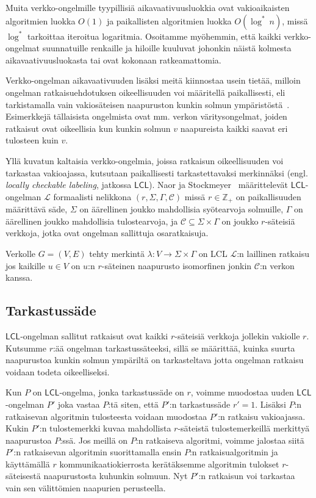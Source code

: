 \documentclass[12pt,finnish]{tktltiki2}
\theoremstyle{definition}
\theoremstyle{remark}
\newcommand*{\lcl}{\ensuremath{\mathsf{LCL}}}
\begin{document}
Muita verkko-ongelmille tyypillisiä aikavaativuusluokkia ovat vakioaikaisten algoritmien luokka $O(1)$ ja paikallisten algoritmien luokka $O(\log^*\ n)$, missä $\log^*$ tarkoittaa iteroitua logaritmia. Osoitamme myöhemmin, että kaikki verkko-ongelmat suunnatuille renkaille ja hiloille kuuluvat johonkin näistä kolmesta aikavaativuusluokasta tai ovat kokonaan ratkeamattomia.

Verkko-ongelman aikavaativuuden lisäksi meitä kiinnostaa usein tietää, milloin ongelman ratkaisuehdotuksen oikeellisuuden voi määritellä paikallisesti, eli tarkistamalla vain vakiosäteisen naapuruston kunkin solmun ympäristöstä~\cite{linial92}. Esimerkkejä tällaisista ongelmista ovat mm. verkon väritysongelmat, joiden ratkaisut ovat oikeellisia kun kunkin solmun $v$ naapureista kaikki saavat eri tulosteen kuin $v$.

Yllä kuvatun kaltaisia verkko-ongelmia, joissa ratkaisun oikeellisuuden voi tarkastaa vakioajassa, kutsutaan paikallisesti tarkastettavaksi merkinnäksi (engl. \textit{locally checkable labeling}, jatkossa \lcl). Naor ja Stockmeyer~\cite{naor95} määrittelevät \lcl-ongelman $\mathcal{L}$ formaalisti nelikkona $(r, \Sigma, \Gamma, \mathcal{C})$ missä $r \in \mathbb{Z}_+$ on paikallisuuden määrittävä säde, $\Sigma$ on äärellinen joukko mahdollisia syötearvoja solmuille, $\Gamma$ on äärellinen joukko mahdollisia tulostearvoja, ja $\mathcal{C} \subseteq \Sigma \times \Gamma$ on joukko $r$-säteisiä verkkoja, jotka ovat ongelman sallittuja osaratkaisuja.


Verkolle $G = (V, E)$ tehty merkintä $\lambda : V \rightarrow \Sigma \times \Gamma$ on LCL $\mathcal{L}$:n laillinen ratkaisu jos kaikille $u \in V$ on $u$:n $r$-säteinen naapurusto isomorfinen jonkin $\mathcal{C}$:n verkon kanssa.

\subsection{Tarkastussäde}
\lcl -ongelman sallitut ratkaisut ovat kaikki $r$-säteisiä verkkoja jollekin vakiolle $r$. Kutsumme $r$:ää ongelman tarkastussäteeksi, sillä se määrittää, kuinka suurta naapurustoa kunkin solmun ympäriltä on tarkasteltava jotta ongelman ratkaisu voidaan todeta oikeelliseksi.

Kun $P$ on \lcl -ongelma, jonka tarkastussäde on $r$, voimme muodostaa uuden \lcl -ongelman $P'$ joka vastaa $P$:tä siten, että $P'$:n tarkastussäde $r' = 1$. Lisäksi $P$:n ratkaisevan algoritmin tulosteesta voidaan muodostaa $P'$:n ratkaisu vakioajassa. Kukin $P'$:n tulostemerkki kuvaa mahdollista $r$-säteistä tulostemerkeillä merkittyä naapurustoa $P$:ssä. Jos meillä on $P$:n ratkaiseva algoritmi, voimme jalostaa siitä $P'$:n ratkaisevan algoritmin suorittamalla ensin $P$:n ratkaisualgoritmin ja käyttämällä $r$ kommunikaatiokierrosta kerätäksemme algoritmin tulokset $r$-säteisestä naapurustosta kuhunkin solmuun. Nyt $P'$:n ratkaisun voi tarkastaa vain sen välittömien naapurien perusteella.
\end{document}
